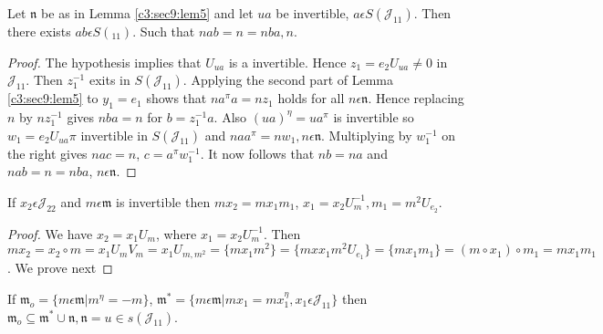 \begin{lemma}\label{c3:sec9:lem6}
Let $\mathfrak{n}$ be as in Lemma \ref{c3:sec9:lem5} and let $ua$ be invertible,
$a\epsilon S(\mathscr{J}_{11})$. Then there exists $a b\epsilon
S(_{11})$. Such that $nab=n=nba,n$.
\end{lemma}

\begin{proof}
The hypothesis implies that $U_{ua}$ is a invertible. Hence
$z_1=e_2U_{ua}\neq 0$ in $\mathscr{J}_{11}$. Then $z^{-1}_1$ exits in
$S(\mathscr{J}_{11})$. Applying the second part of Lemma \ref{c3:sec9:lem5} to
$y_1=e_1$ shows that $na^{\pi}a=nz_1$ holds for all $n\epsilon
\mathfrak{n}$. Hence replacing $n$ by $nz^{-1}_1$ gives $nba=n$ for
$b=z^{-1}_1a$. Also $(ua)^{\eta}=ua^{\pi}$ is invertible so
$w_1=e_2U_{ua}\pi$ invertible in $S(\mathscr{J}_{11})$\pageoriginale
and $naa^{\pi}=nw_1, n\epsilon \mathfrak{n}$. Multiplying by
$w^{-1}_1$ on the right gives $nac=n$, $c=a^{\pi} w^{-1}_1$. It now
follows that $nb=na$ and $nab=n=nba$, $n\epsilon\mathfrak{n}$. 
\end{proof}

\begin{lemma}\label{c3:sec9:lem7}
  If $x_2\epsilon \mathscr{J}_{22}$ and $m\epsilon \mathfrak{m}$ is
  invertible then $mx_2=mx_1m_1$, $x_1=x_2U^{-1}_m, m_1=m^{2}U_{e_2}$.
\end{lemma}

\begin{proof}
  We have $x_2=x_1U_m$, where $x_1=x_2U^{-1}_m$. Then $mx_2=x_2\circ m=
  x_1U_mV_m=x_1U_{m,m^{2}}=\{m x_1m^{2}\}=\{mxx_1m^{2}U_{e_1}\}=\{m
  x_1m_1\}=(m\circ x_1)\circ m_1=mx_1 m_1$. 
  We prove next
\end{proof}

\begin{lemma}\label{c3:sec9:lem8}
If $\mathfrak{m}_o=\{m\epsilon \mathfrak{m}|m^{\eta}=-m\}$,
$\mathfrak{m}^{\ast}=\{m\epsilon
\mathfrak{m}|mx_1=mx^{\eta}_1,x_1\epsilon \mathscr{J}_{11}\}$ then
$\mathfrak{m}_o\subseteq
\mathfrak{m}^{\ast}\cup\mathfrak{n},\mathfrak{n}=u \in s(\mathscr{J}_{11})$. 
\end{lemma}

